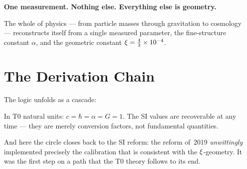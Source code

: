 \begin{zusammenfassung}
\textbf{One measurement. Nothing else. Everything else is geometry.}

The whole of physics --- from particle masses through gravitation to cosmology --- reconstructs itself from a single measured parameter, the fine-structure constant $\alpha$, and the geometric constant $\xi = \frac{4}{3} \times 10^{-4}$.
\end{zusammenfassung}

\section{The Derivation Chain}

The logic unfolds as a cascade:

\begin{center}
\end{center}

In T0 natural units: $c = \hbar = \alpha = G = 1$. The SI values are recoverable at any time --- they are merely conversion factors, not fundamental quantities.

And here the circle closes back to the SI reform: the reform of~2019 \emph{unwittingly} implemented precisely the calibration that is consistent with the $\xi$-geometry. It was the first step on a path that the T0 theory follows to its end.
